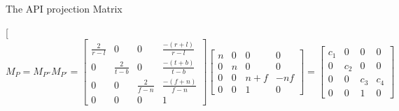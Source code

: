 \documentclass[conference]{IEEEtran}
\begin{document}
The API projection Matrix

\twocolumn[
    \begin{equation} \label{eqn:API_matrix}
        M_{P} = M_{P''} M_{P'} =
        \begin{bmatrix}
            \frac{2}{r - l} & 0               & 0               & \frac{-(r + l)}{r - l} \\
            0               & \frac{2}{t - b} & 0               & \frac{-(t + b)}{t - b} \\
            0               & 0               & \frac{2}{f - n} & \frac{-(f + n)}{f - n} \\
            0               & 0               & 0               & 1
        \end{bmatrix}
        \begin{bmatrix}
            n & 0 & 0     & 0   \\
            0 & n & 0     & 0   \\
            0 & 0 & n + f & -nf \\
            0 & 0 & 1     & 0
        \end{bmatrix}
        =
        \begin{bmatrix}
            c_1 & 0   & 0   & 0   \\
            0   & c_2 & 0   & 0   \\
            0   & 0   & c_3 & c_4 \\
            0   & 0   & 1   & 0
        \end{bmatrix}
    \end{equation}
\end{document}
